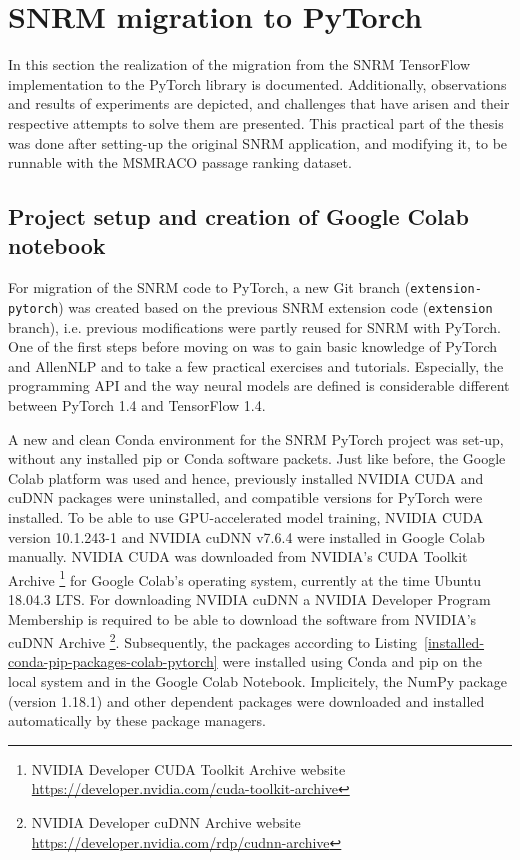 \section{SNRM migration to PyTorch}

In this section the realization of the migration from the SNRM TensorFlow implementation to the PyTorch library
    is documented.
Additionally, observations and results of experiments are depicted, and
    challenges that have arisen and their respective attempts to solve them are presented.
This practical part of the thesis was done after setting-up the original SNRM application,
    and modifying it, to be runnable with the MSMRACO passage ranking dataset.

\subsection{Project setup and creation of Google Colab notebook}
For migration of the SNRM code to PyTorch, a new Git branch (\texttt{extension-pytorch})
    was created based on the previous SNRM extension code (\texttt{extension} branch), 
    i.e. previous modifications were partly reused for SNRM with PyTorch.
One of the first steps before moving on was to gain basic knowledge of PyTorch and AllenNLP
    and to take a few practical exercises and tutorials.
Especially, the programming API and the way neural models are defined is considerable
    different between PyTorch 1.4 and TensorFlow 1.4.

A new and clean Conda environment for the SNRM PyTorch project was set-up,
    without any installed pip or Conda software packets.
Just like before, the Google Colab platform was used and hence, previously 
    installed NVIDIA CUDA and cuDNN packages were uninstalled,
    and compatible versions for PyTorch were installed.
To be able to use GPU-accelerated model training, NVIDIA CUDA version 10.1.243-1 
    and NVIDIA cuDNN v7.6.4 were installed in Google Colab manually.
NVIDIA CUDA was downloaded from NVIDIA's CUDA Toolkit Archive
    \footnote{NVIDIA Developer CUDA Toolkit Archive website \url{https://developer.nvidia.com/cuda-toolkit-archive}}
    for Google Colab's operating system, currently at the time Ubuntu 18.04.3 LTS.
For downloading NVIDIA cuDNN a NVIDIA Developer Program Membership is required to be able to
    download the software from NVIDIA's cuDNN Archive
    \footnote{NVIDIA Developer cuDNN Archive website \url{https://developer.nvidia.com/rdp/cudnn-archive}}.
Subsequently, the packages according to Listing~\ref{installed-conda-pip-packages-colab-pytorch} 
    were installed using Conda and pip on the local system and in the Google Colab Notebook.
Implicitely, the NumPy package (version 1.18.1) and other dependent packages were downloaded
    and installed automatically by these package managers.

